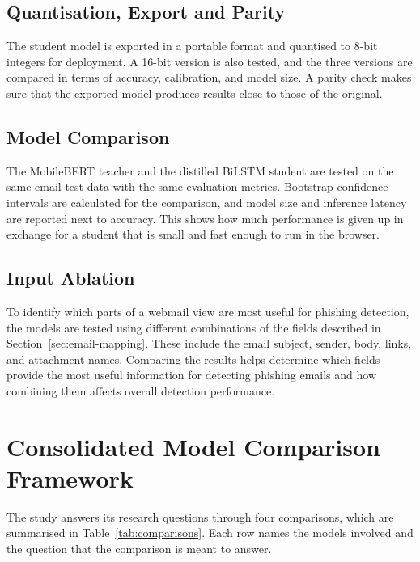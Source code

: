 \documentclass{FastFyp}
\begin{document}
\subsection{Quantisation, Export and Parity}
The student model is exported in a portable format and quantised to 8-bit integers for deployment. A 16-bit version is also tested, and the three versions are compared in terms of accuracy, calibration, and model size. A parity check makes sure that the exported model produces results close to those of the original.

\subsection{Model Comparison}
The MobileBERT teacher and the distilled BiLSTM student are tested on the same email test data with the same evaluation metrics. Bootstrap confidence intervals are calculated for the comparison, and model size and inference latency are reported next to accuracy. This shows how much performance is given up in exchange for a student that is small and fast enough to run in the browser.

\subsection{Input Ablation}
To identify which parts of a webmail view are most useful for phishing detection, the models are tested using different combinations of the fields described in Section~\ref{sec:email-mapping}. These include the email subject, sender, body, links, and attachment names. Comparing the results helps determine which fields provide the most useful information for detecting phishing emails and how combining them affects overall detection performance.

\section{Consolidated Model Comparison Framework}
\label{sec:comparison}
The study answers its research questions through four comparisons, which are summarised in Table~\ref{tab:comparisons}. Each row names the models involved and the question that the comparison is meant to answer.
\end{document}
